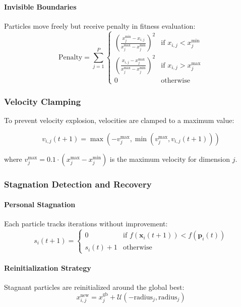 \documentclass[12pt,a4paper]{article}
\begin{document}
\paragraph{Invisible Boundaries}
Particles move freely but receive penalty in fitness evaluation:
\begin{equation}
\text{Penalty} = \sum_{j=1}^{P} \begin{cases}
\left(\frac{x_j^{\min} - x_{i,j}}{x_j^{\max} - x_j^{\min}}\right)^2 & \text{if } x_{i,j} < x_j^{\min} \\
\left(\frac{x_{i,j} - x_j^{\max}}{x_j^{\max} - x_j^{\min}}\right)^2 & \text{if } x_{i,j} > x_j^{\max} \\
0 & \text{otherwise}
\end{cases} \label{eq:invisible_boundaries}
\end{equation}

\subsubsection{Velocity Clamping}

To prevent velocity explosion, velocities are clamped to a maximum value:

\begin{equation}
v_{i,j}(t+1) = \max(-v_{j}^{\max}, \min(v_{j}^{\max}, v_{i,j}(t+1))) \label{eq:velocity_clamping}
\end{equation}

where $v_{j}^{\max} = 0.1 \cdot (x_j^{\max} - x_j^{\min})$ is the maximum velocity for dimension $j$.

\subsubsection{Stagnation Detection and Recovery}

\paragraph{Personal Stagnation}
Each particle tracks iterations without improvement:
\begin{equation}
s_i(t+1) = \begin{cases}
0 & \text{if } f(\mathbf{x}_i(t+1)) < f(\mathbf{p}_i(t)) \\
s_i(t) + 1 & \text{otherwise}
\end{cases} \label{eq:personal_stagnation}
\end{equation}

\paragraph{Reinitialization Strategy}
Stagnant particles are reinitialized around the global best:
\begin{equation}
x_{i,j}^{\text{new}} = x_{j}^{\text{gb}} + \mathcal{U}(-\text{radius}_j, \text{radius}_j) \label{eq:reinitialization}
\end{equation}
\end{document}
